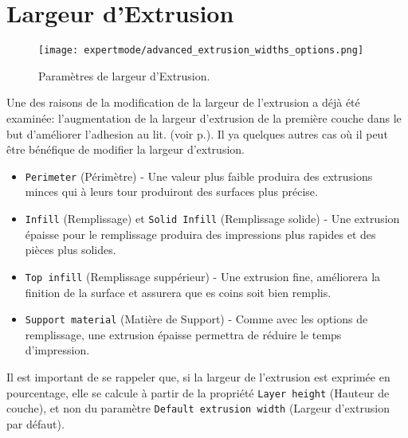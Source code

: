 
\section{Largeur d'Extrusion} %
\label{sec:extrusion_width}

\begin{figure}[H]
\centering
\texttt{[image: expertmode/advanced\_extrusion\_widths\_options.png]}
\caption{Paramètres de largeur d'Extrusion.}
\label{fig:advanced_extrusion_widths_options}
\end{figure}

Une des raisons de la modification de la largeur de l'extrusion a déjà été examinée: l'augmentation de la largeur d'extrusion de la première couche dans le but d'améliorer l'adhesion au lit. (voir p.\pageref{par:wider_extrusion_width}).  Il ya quelques autres cas où il peut être bénéfique de modifier la largeur d'extrusion.
\begin{itemize}
    \item \texttt{Perimeter} (Périmètre) - Une valeur plus faible produira des extrusions minces qui à leurs tour produiront des surfaces plus précise.
    \item \texttt{Infill} (Remplissage) et \texttt{Solid Infill} (Remplissage solide) - Une extrusion épaisse pour le remplissage produira des impressions plus rapides et des pièces plus solides.
    \item \texttt{Top infill} (Remplissage suppérieur) - Une extrusion fine, améliorera la finition de la surface et assurera que es coins soit bien remplis.
    \item \texttt{Support material} (Matière de Support) - Comme avec les options de remplissage, une extrusion épaisse permettra de réduire le temps d'impression.
\end{itemize}

Il est important de se rappeler que, si la largeur de l'extrusion est exprimée en pourcentage, elle se calcule à partir de la propriété \texttt{Layer height} (Hauteur de couche), et non du paramètre \texttt{Default extrusion width} (Largeur d'extrusion par défaut).

